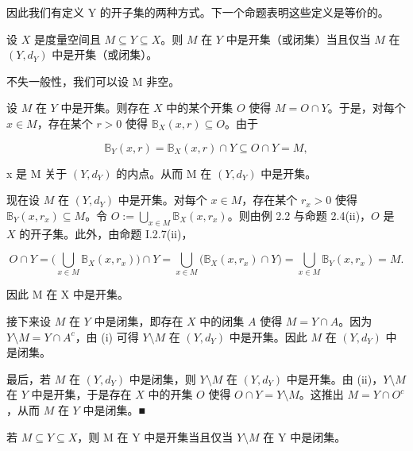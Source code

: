 因此我们有定义 Y 的开子集的两种方式。下一个命题表明这些定义是等价的。

\begin{proposition}

设 $X$ 是度量空间且 $M \subseteq Y \subseteq X$。则 $M$ 在 $Y$ 中是开集（或闭集）当且仅当 $M$ 在 $(Y, d_Y)$ 中是开集（或闭集）。

\proofhead
不失一般性，我们可以设 M 非空。

\begin{subitems}
\item

设 $M$ 在 $Y$ 中是开集。则存在 $X$ 中的某个开集 $O$ 使得 $M = O \cap Y$。于是，对每个 $x \in M$，存在某个 $r > 0$ 使得 $\mathbb{B}_X(x, r) \subseteq O$。由于

\[
\mathbb{B}_{Y}(x,r)=\mathbb{B}_{X}(x,r)\cap Y\subseteq O\cap Y=M,
\]

x 是 M 关于 $ (Y, d_{Y}) $ 的内点。从而 M 在 $ (Y, d_{Y}) $ 中是开集。

\item

现在设 $M$ 在 $(Y, d_Y)$ 中是开集。对每个 $x \in M$，存在某个 $r_x > 0$ 使得 $\mathbb{B}_Y(x, r_x) \subseteq M$。令 $O := \bigcup_{x \in M} \mathbb{B}_X(x, r_x)$。则由例 2.2 与命题 2.4(ii)，$O$ 是 $X$ 的开子集。此外，由命题 I.2.7(ii)，

\[
O\cap Y=\Big(\bigcup_{x\in M}\mathbb{B}_{X}(x,r_{x})\Big)\cap Y=\bigcup_{x\in M}\big(\mathbb{B}_{X}(x,r_{x})\cap Y\big)=\bigcup_{x\in M}\mathbb{B}_{Y}(x,r_{x})=M.
\]

因此 M 在 X 中是开集。

\item

接下来设 $M$ 在 $Y$ 中是闭集，即存在 $X$ 中的闭集 $A$ 使得 $M = Y \cap A$。因为 $Y \setminus M = Y \cap A^c$，由 (i) 可得 $Y \setminus M$ 在 $(Y, d_Y)$ 中是开集。因此 $M$ 在 $(Y, d_Y)$ 中是闭集。

\item

最后，若 $M$ 在 $(Y, d_Y)$ 中是闭集，则 $Y \setminus M$ 在 $(Y, d_Y)$ 中是开集。由 (ii)，$Y \setminus M$ 在 $Y$ 中是开集，于是存在 $X$ 中的开集 $O$ 使得 $O \cap Y = Y \setminus M$。这推出 $M = Y \cap O^c$，从而 $M$ 在 $Y$ 中是闭集。■

\end{subitems}

\end{proposition}

\begin{corollary}

若 $ M \subseteq Y \subseteq X $，则 M 在 Y 中是开集当且仅当 $ Y \setminus M $ 在 Y 中是闭集。

\end{corollary}

